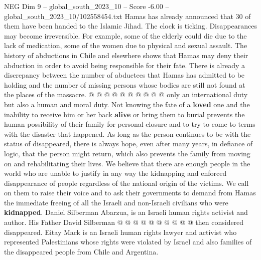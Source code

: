 \begin{textsample}{NEG Dim 9 – global\_south\_2023\_10 – Score -6.00 – global\_south\_2023\_10/102558454.txt}
Hamas has already announced that 30 of them have been handed to the Islamic Jihad.
The clock is ticking.
Disappearances may become irreversible.
For example, some of the elderly could die due to the lack of medication, some of the women due to physical and sexual assault.
The history of abductions in Chile and elsewhere shows that Hamas may deny their abduction in order to avoid being responsible for their fate.
There is already a discrepancy between the number of abductees that Hamas has admitted to be holding and the number of missing persons whose bodies are still not found at the places of the massacre. @ @ @ @ @ @ @ @ @ @ only an international duty but also a human and moral duty.
Not knowing the fate of a \textbf{loved} one and the inability to receive him or her back \textbf{alive} or bring them to burial prevents the human possibility of their family for personal closure and to try to come to terms with the disaster that happened.
As long as the person continues to be with the status of disappeared, there is always hope, even after many years, in defiance of logic, that the person might return, which also prevents the family from moving on and rehabilitating their lives.
We believe that there are enough people in the world who are unable to justify in any way the kidnapping and enforced disappearance of people regardless of the national origin of the victims.
We call on them to raise their voice and to ask their governments to demand from Hamas the immediate freeing of all the Israeli and non-Israeli civilians who were \textbf{kidnapped}.
Daniel Silberman Abarzua, is an Israeli human rights activist and author.
His Father David Silberman @ @ @ @ @ @ @ @ @ @ then considered disappeared.
Eitay Mack is an Israeli human rights lawyer and activist who represented Palestinians whose rights were violated by Israel and also families of the disappeared people from Chile and Argentina.

\end{textsample}
